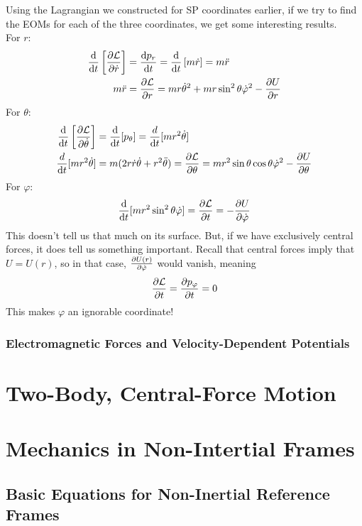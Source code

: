 \documentclass[a4paper]{article}
\begin{document}
Using the Lagrangian we constructed for SP coordinates earlier, if we try
to find the EOMs for each of the three coordinates, we get some interesting
results.\\
For $r$:
\begin{align*}
	\frac{\mathrm{d}}{\mathrm{d} t}\left[\frac{\partial \mathcal{L}}{\partial \dot{r}}\right] &=
	\frac{\mathrm{d} p_r}{\mathrm{d} t} = \frac{\mathrm{d}}{\mathrm{d} t}\left[m\dot{r}\right]= m\ddot{r}\\
	m\ddot{r} &= \frac{\partial \mathcal{L}}{\partial r} = mr\dot{\theta}^2+mr\sin^2\theta
	\dot{\varphi}^2-\frac{\partial U}{\partial r}
\end{align*}
For $\theta$:
\begin{align*}
	\frac{\mathrm{d}}{\mathrm{d} t}\left[\frac{\partial \mathcal{L}}{\partial \dot{\theta}}\right] &=
	\frac{\mathrm{d}}{\mathrm{d} t}[p_\theta] = \frac{d}{\mathrm{d} t}[mr^2\dot{\theta}]\\
	\frac{d}{\mathrm{d} t}[mr^2\dot{\theta}] &= m(2r\dot{r}\dot{\theta} +
	r^2\ddot{\theta}) = \frac{\partial \mathcal{L}}{\partial \theta} = mr^2\sin\theta\cos\theta
	\dot{\varphi}^2-\frac{\partial U}{\partial \theta}
\end{align*}
For $\varphi$:
\begin{align*}
	\frac{\mathrm{d}}{\mathrm{d} t}[mr^2\sin^2\theta\dot{\varphi}]=
	\frac{\partial \mathcal{L}}{\partial t} = -\frac{\partial U}{\partial \dot{\varphi}}
\end{align*}
This doesn't tell us that much on its surface. But, if we have exclusively
central forces, it does tell us something important. Recall that central forces
imply that $U = U(r)$, so in that case, $\frac{\partial U(r)}{\partial \dot{\varphi}}$ would
vanish, meaning
\[ \frac{\partial \mathcal{L}}{\partial t} = \frac{\partial p_{\varphi}}{\partial t} = 0 \]
This makes $\varphi$ an ignorable coordinate!

\subsubsection{Electromagnetic Forces and Velocity-Dependent Potentials}

\section{Two-Body, Central-Force Motion}

\section{Mechanics in Non-Intertial Frames}
\subsection{Basic Equations for Non-Inertial Reference Frames}
\end{document}
